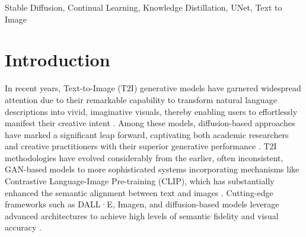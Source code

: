 \documentclass[a4paper,fleqn]{ieeetj}
\begin{document}






\begin{IEEEkeywords}
Stable Diffusion, Continual Learning, Knowledge Distillation, UNet, Text to Image
\end{IEEEkeywords}
\maketitle
\section{Introduction}
In recent years, Text-to-Image (T2I) generative models have garnered widespread attention due to their remarkable capability to transform natural language descriptions into vivid, imaginative visuals, thereby enabling users to effortlessly manifest their creative intent \cite{sawant2021text}. Among these models, diffusion-based approaches have marked a significant leap forward, captivating both academic researchers and creative practitioners with their superior generative performance \cite{zhang2025diff}. T2I methodologies have evolved considerably from the earlier, often inconsistent, GAN-based models to more sophisticated systems incorporating mechanisms like Contrastive Language-Image Pre-training (CLIP), which has substantially enhanced the semantic alignment between text and images \cite{sawant2021text, ding2024clip}. Cutting-edge frameworks such as DALL·E, Imagen, and diffusion-based models leverage advanced architectures to achieve high levels of semantic fidelity and visual accuracy \cite{baldridge2024imagen}.
\end{document}
